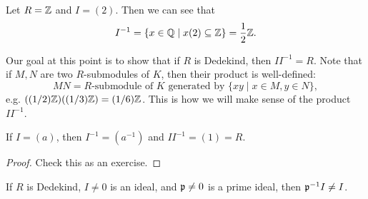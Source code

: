 \begin{example}
  Let $R = \mathbb{Z}$ and $I = (2)$. Then we can
  see that
  \[
    I^{-1} = \{x \in \mathbb{Q} \mid x (2) \subseteq \mathbb{Z}\}
    = \frac{1}{2} \mathbb{Z}.
  \]
\end{example}

\begin{remark}
  Our goal at this point is to show that if $R$ is
  Dedekind, then $I I^{-1} = R$. Note that if
  $M, N$ are two $R$-submodules of $K$, then their
  product is well-defined:
  \[
    MN = \text{$R$-submodule of $K$ generated by } \{xy \mid x \in M, y \in N\},
  \]
  e.g. $((1 / 2)\mathbb{Z})((1 / 3)\mathbb{Z}) = (1 / 6)\mathbb{Z}$. This is
  how we will make sense of the product $II^{-1}$.
\end{remark}

\begin{lemma}
  If $I = (a)$, then $I^{-1} = (a^{-1})$ and
  $I I^{-1} = (1) = R$.
\end{lemma}

\begin{proof}
  Check this as an exercise.
\end{proof}

\begin{prop}
  If $R$ is Dedekind, $I \ne 0$ is an ideal, and
  $\mathfrak{p} \ne 0$ is a prime ideal, then $\mathfrak{p}^{-1} I \ne I$.
\end{prop}

